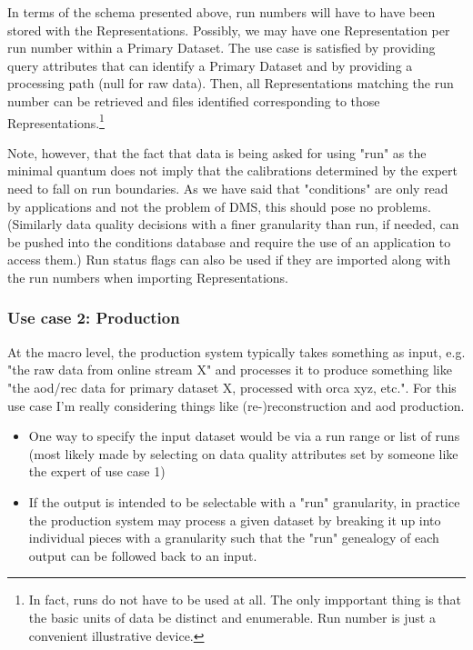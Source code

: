 \documentclass{cmspaper}
\begin{document}
In terms of the schema presented above, run numbers will have to have been 
stored with the Representations.  Possibly, we may have one Representation
per run number within a Primary Dataset.  The use case is satisfied by 
providing query attributes that can identify a Primary Dataset and by 
providing a processing path (null for raw data).  Then, all 
Representations matching the run number can be retrieved and files 
identified corresponding to those Representations.\footnote{In fact, runs 
do not have to be used at all.  The only impportant thing is that the 
basic units of data be distinct and enumerable.  Run number is just a convenient 
illustrative device.}

Note, however, that the fact that data is being asked for using "run" as
the minimal quantum does not imply that the calibrations determined by
the expert need to fall on run boundaries. As we have said that "conditions"
are only read by applications and not the problem of DMS, this should pose no
problems. (Similarly data quality decisions with a finer granularity than 
run, if needed, can be pushed into the conditions database and require 
the use of an application to access them.)  Run status flags can also be used 
if they are imported along with the run numbers when importing Representations.

\subsubsection{Use case 2: Production}
\label{sec:UCprod}

  At the macro level, the production system typically takes something 
as input, e.g. "the raw data from online stream X" and processes it to
produce something like "the aod/rec data for primary dataset X, processed
with orca xyz, etc.". For this use case I'm really considering things
like (re-)reconstruction and aod production.


\begin{itemize}
\item One way to specify the input dataset would be via a run range or list
     of runs (most likely made by selecting on data quality attributes set by
     someone like the expert of use case 1)
\item If the output is intended to be selectable with a "run" granularity,
     in practice the production system may process a given dataset by 
     breaking it up into individual pieces with a granularity such that
     the "run" genealogy of each output can be followed back to an input.
\end{itemize}
\end{document}

